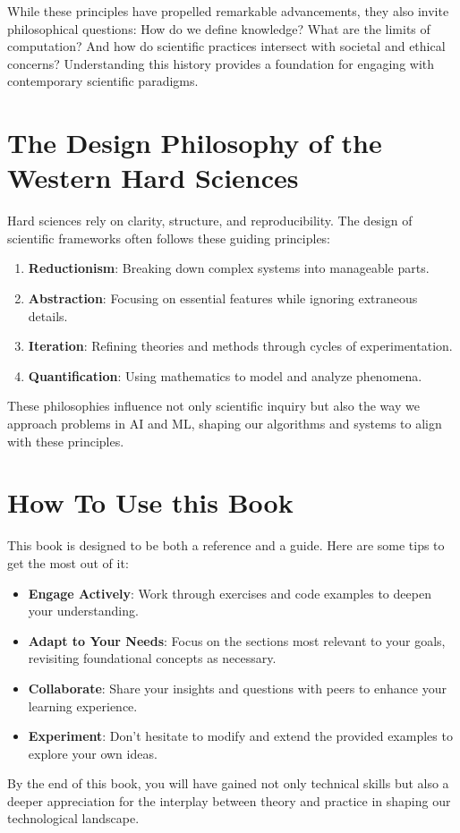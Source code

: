 While these principles have propelled remarkable advancements, they also invite philosophical questions: How do we define knowledge? What are the limits of computation? And how do scientific practices intersect with societal and ethical concerns? Understanding this history provides a foundation for engaging with contemporary scientific paradigms.

\section{The Design Philosophy of the Western Hard Sciences}
Hard sciences rely on clarity, structure, and reproducibility. The design of scientific frameworks often follows these guiding principles:
\begin{enumerate}
    \item \textbf{Reductionism}: Breaking down complex systems into manageable parts.
    \item \textbf{Abstraction}: Focusing on essential features while ignoring extraneous details.
    \item \textbf{Iteration}: Refining theories and methods through cycles of experimentation.
    \item \textbf{Quantification}: Using mathematics to model and analyze phenomena.
\end{enumerate}
These philosophies influence not only scientific inquiry but also the way we approach problems in AI and ML, shaping our algorithms and systems to align with these principles.

\section{How To Use this Book}
This book is designed to be both a reference and a guide. Here are some tips to get the most out of it:
\begin{itemize}
    \item \textbf{Engage Actively}: Work through exercises and code examples to deepen your understanding.
    \item \textbf{Adapt to Your Needs}: Focus on the sections most relevant to your goals, revisiting foundational concepts as necessary.
    \item \textbf{Collaborate}: Share your insights and questions with peers to enhance your learning experience.
    \item \textbf{Experiment}: Don’t hesitate to modify and extend the provided examples to explore your own ideas.
\end{itemize}
By the end of this book, you will have gained not only technical skills but also a deeper appreciation for the interplay between theory and practice in shaping our technological landscape.
